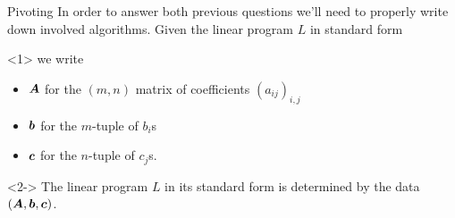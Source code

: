 \documentclass[32pt, aspectratio = 169]{beamer}
\begin{document}
\begin{frame}{Pivoting}
    In order to answer both previous questions we'll need to properly write down involved algorithms. Given the linear program $L$ in standard form
    \begin{figure}
    \end{figure}
    \begin{overlayarea}{\textwidth}{.3\textheight}
        \begin{onlyenv}<1>
            we write
            \begin{itemize}
            \item[\textbullet] $\boldsymbol{A}$ for the $(m, n)$ matrix of coefficients $(a_{ij})_{i, j}$
            \item[\textbullet] $\boldsymbol{b}$ for the $m$-tuple of $b_i$s
            \item[\textbullet] $\boldsymbol{c}$ for the $n$-tuple of $c_j$s.
            \end{itemize}
        \end{onlyenv}
        \begin{onlyenv}<2->
            The linear program $L$ in its standard form is determined by the data $(\boldsymbol{A}, \boldsymbol{b}, \boldsymbol{c})$. 
        \end{onlyenv}
    \end{overlayarea}
\end{frame}
\end{document}
